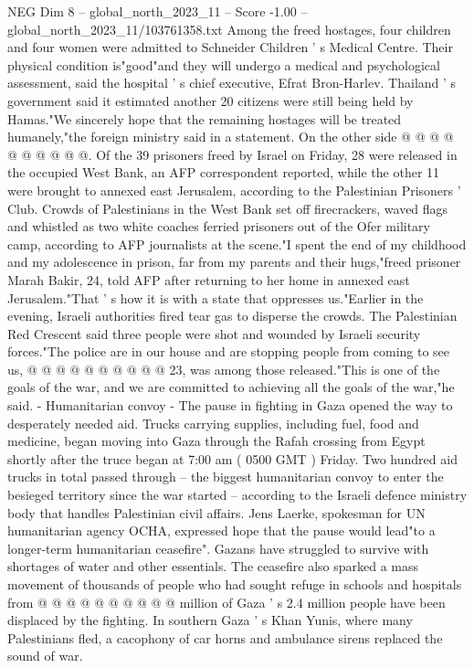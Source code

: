 \begin{textsample}{NEG Dim 8 – global\_north\_2023\_11 – Score -1.00 – global\_north\_2023\_11/103761358.txt}
Among the freed hostages, four children and four women were admitted to Schneider Children ' s Medical Centre.
Their physical condition is"good"and they will undergo a medical and psychological assessment, said the hospital ' s chief executive, Efrat Bron-Harlev.
Thailand ' s government said it estimated another 20 citizens were still being held by Hamas."We sincerely hope that the remaining hostages will be treated humanely,"the foreign ministry said in a statement.
On the other side @ @ @ @ @ @ @ @ @ @.
Of the 39 prisoners freed by Israel on Friday, 28 were released in the occupied West Bank, an AFP correspondent reported, while the other 11 were brought to annexed east Jerusalem, according to the Palestinian Prisoners ' Club.
Crowds of Palestinians in the West Bank set off firecrackers, waved flags and whistled as two white coaches ferried prisoners out of the Ofer military camp, according to AFP journalists at the scene."I spent the end of my childhood and my adolescence in prison, far from my parents and their hugs,"freed prisoner Marah Bakir, 24, told AFP after returning to her home in annexed east Jerusalem."That ' s how it is with a state that oppresses us."Earlier in the evening, Israeli authorities fired tear gas to disperse the crowds.
The Palestinian Red Crescent said three people were shot and wounded by Israeli security forces."The police are in our house and are stopping people from coming to see us, @ @ @ @ @ @ @ @ @ @ 23, was among those released."This is one of the goals of the war, and we are committed to achieving all the goals of the war,"he said. - Humanitarian convoy - The pause in fighting in Gaza opened the way to desperately needed aid.
Trucks carrying supplies, including fuel, food and medicine, began moving into Gaza through the Rafah crossing from Egypt shortly after the truce began at 7:00 am ( 0500 GMT ) Friday.
Two hundred aid trucks in total passed through -- the biggest humanitarian convoy to enter the besieged territory since the war started -- according to the Israeli defence ministry body that handles Palestinian civil affairs.
Jens Laerke, spokesman for UN humanitarian agency OCHA, expressed hope that the pause would lead"to a longer-term humanitarian ceasefire".
Gazans have struggled to survive with shortages of water and other essentials.
The ceasefire also sparked a mass movement of thousands of people who had sought refuge in schools and hospitals from @ @ @ @ @ @ @ @ @ @ million of Gaza ' s 2.4 million people have been displaced by the fighting.
In southern Gaza ' s Khan Yunis, where many Palestinians fled, a cacophony of car horns and ambulance sirens replaced the sound of war.

\end{textsample}
